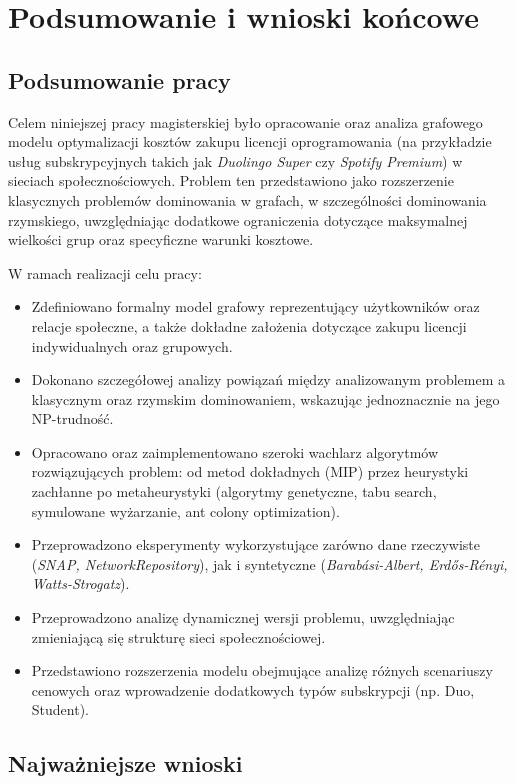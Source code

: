 \chapter{Podsumowanie i wnioski końcowe}

\section{Podsumowanie pracy}

Celem niniejszej pracy magisterskiej było opracowanie oraz analiza grafowego modelu optymalizacji kosztów zakupu licencji oprogramowania (na przykładzie usług subskrypcyjnych takich jak \textit{Duolingo Super} czy \textit{Spotify Premium}) w sieciach społecznościowych. Problem ten przedstawiono jako rozszerzenie klasycznych problemów dominowania w grafach, w szczególności dominowania rzymskiego, uwzględniając dodatkowe ograniczenia dotyczące maksymalnej wielkości grup oraz specyficzne warunki kosztowe.

W ramach realizacji celu pracy:

\begin{itemize}
    \item Zdefiniowano formalny model grafowy reprezentujący użytkowników oraz relacje społeczne, a także dokładne założenia dotyczące zakupu licencji indywidualnych oraz grupowych.
    \item Dokonano szczegółowej analizy powiązań między analizowanym problemem a klasycznym oraz rzymskim dominowaniem, wskazując jednoznacznie na jego NP-trudność.
    \item Opracowano oraz zaimplementowano szeroki wachlarz algorytmów rozwiązujących problem: od metod dokładnych (MIP) przez heurystyki zachłanne po metaheurystyki (algorytmy genetyczne, tabu search, symulowane wyżarzanie, ant colony optimization).
    \item Przeprowadzono eksperymenty wykorzystujące zarówno dane rzeczywiste (\textit{SNAP, NetworkRepository}), jak i syntetyczne (\textit{Barabási-Albert, Erdős-Rényi, Watts-Strogatz}).
    \item Przeprowadzono analizę dynamicznej wersji problemu, uwzględniając zmieniającą się strukturę sieci społecznościowej.
    \item Przedstawiono rozszerzenia modelu obejmujące analizę różnych scenariuszy cenowych oraz wprowadzenie dodatkowych typów subskrypcji (np. Duo, Student).
\end{itemize}

\section{Najważniejsze wnioski}

